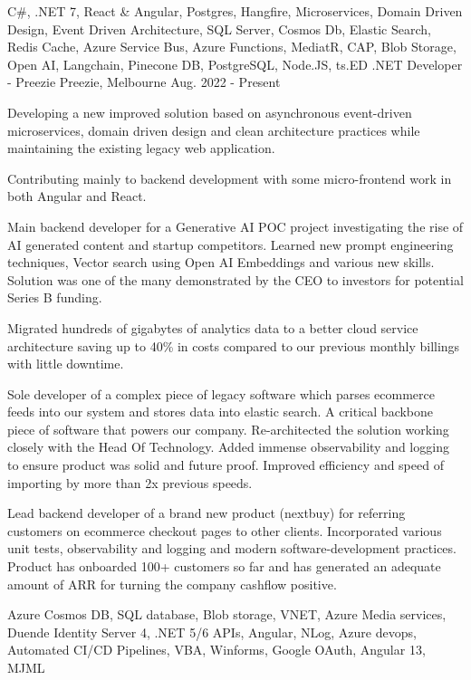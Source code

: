 

\begin{cventries}
  \cventry
    {C\#, .NET 7, React \& Angular, Postgres, Hangfire, Microservices, Domain Driven Design, Event Driven Architecture, SQL Server, Cosmos Db, Elastic Search, Redis Cache, Azure Service Bus, Azure Functions, MediatR, CAP, Blob Storage, Open AI, Langchain, Pinecone DB, PostgreSQL, Node.JS, ts.ED}
    {.NET Developer - Preezie}
    {Preezie, Melbourne}
    {Aug. 2022 - Present}
    {
      \begin{cvitems}
        \item {Developing a new improved solution based on asynchronous event-driven microservices, domain driven design and clean architecture practices while maintaining the existing legacy web application.}
        \item {Contributing mainly to backend development with some micro-frontend work in both Angular and React.}
        \item {Main backend developer for a Generative AI POC project investigating the rise of AI generated content and startup competitors. Learned new prompt engineering techniques, Vector search using Open AI Embeddings and various new skills. Solution was one of the many demonstrated by the CEO to investors for potential Series B funding.}
		\item {Migrated hundreds of gigabytes of analytics data to a better cloud service architecture saving up to 40\% in costs compared to our previous monthly billings with little downtime.}
        \item {Sole developer of a complex piece of legacy software which parses ecommerce feeds into our system and stores data into elastic search. A critical backbone piece of software that powers our company. Re-architected the solution working closely with the Head Of Technology. Added immense observability and logging to ensure product was solid and future proof. Improved efficiency and speed of importing by more than 2x previous speeds.}
        \item {Lead backend developer of a brand new product (nextbuy) for referring customers on ecommerce checkout pages to other clients. Incorporated various unit tests, observability and logging and modern software-development practices. Product has onboarded 100+ customers so far and has generated an adequate amount of ARR for turning the company cashflow positive.}
	  \end{cvitems}
    }
  \cventry
    {Azure Cosmos DB, SQL database, Blob storage, VNET, Azure Media services, Duende Identity Server 4, .NET 5/6 APIs, Angular, NLog, Azure devops, Automated CI/CD Pipelines, VBA, Winforms, Google OAuth, Angular 13, MJML}

\end{cventries}
